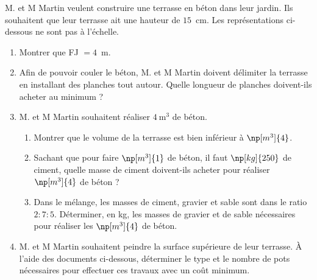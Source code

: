 \documentclass[exercice,a4]{thedocument}%
\begin{document}
%

M. et M Martin veulent construire une terrasse en béton dans leur
jardin. Ils souhaitent que leur terrasse ait une hauteur de $15$~cm. Les
représentations ci-dessous ne sont pas à l'échelle.

\begin{center}

\medskip
{}
\end{center}

\begin{enumerate}
    \item Montrer que FJ $=4$~m.
    \item Afin de pouvoir couler le béton, M. et M Martin doivent
    délimiter la terrasse en installant des planches tout autour. Quelle
    longueur de planches doivent-ils acheter au minimum ?
    \item M. et M Martin souhaitent réaliser $4~\mathrm{m^3}$ de béton.
    \begin{enumerate}
        \item Montrer que le volume de la terrasse est bien inférieur à
        $\np[m^3]{4}$.
        \item Sachant que pour faire $\np[m^3]{1}$ de béton, il faut
        $\np[kg]{250}$ de ciment, quelle masse de ciment doivent-ils acheter
        pour réaliser $\np[m^3]{4}$ de béton ?
        \item Dans le mélange, les masses de ciment, gravier et sable sont
        dans le ratio $2:7:5$. Déterminer, en kg, les masses de gravier et
        de sable nécessaires pour réaliser les $\np[m^3]{4}$ de béton.
    \end{enumerate}
    \item M. et M Martin souhaitent peindre la surface supérieure de
    leur terrasse. À l'aide des documents ci-dessous, déterminer le type et
    le nombre de pots nécessaires pour effectuer ces travaux avec un coût
    minimum.
\end{enumerate}
\end{document}
